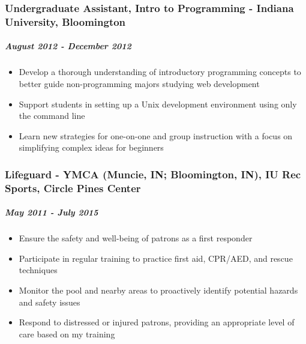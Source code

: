 \documentclass[11pt]{article}
\begin{document}
\subsubsection*{Undergraduate Assistant, Intro to Programming - Indiana University, Bloomington}
\label{sec:org171b907}
\subparagraph*{\emph{August 2012 - December 2012}}
\label{sec:org4f8b0b3}
\begin{itemize}
\item Develop a thorough understanding of introductory programming concepts to better guide non-programming majors studying web development
\item Support students in setting up a Unix development environment using only the command line
\item Learn new strategies for one-on-one and group instruction with a focus on simplifying complex ideas for beginners
\end{itemize}
\subsubsection*{Lifeguard - YMCA (Muncie, IN; Bloomington, IN), IU Rec Sports, Circle Pines Center}
\label{sec:orge9386d4}
\subparagraph*{\emph{May 2011 - July 2015}}
\label{sec:org83cc6a7}
\begin{itemize}
\item Ensure the safety and well-being of patrons as a first responder
\item Participate in regular training to practice first aid, CPR/AED, and
rescue techniques
\item Monitor the pool and nearby areas to proactively identify potential
hazards and safety issues
\item Respond to distressed or injured patrons, providing an appropriate
level of care based on my training
\end{itemize}
\end{document}
